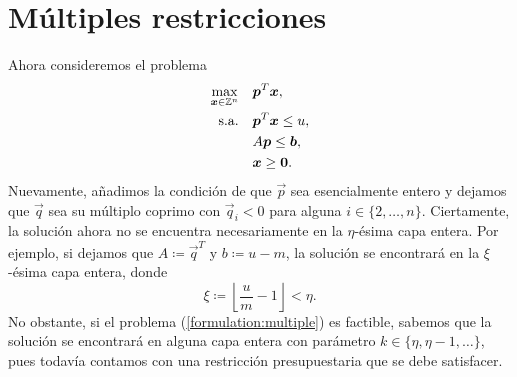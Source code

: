 \section{Múltiples restricciones}
\noindent
Ahora consideremos el problema
\begin{subequations}
	\label{formulation:multiple}
	\begin{align}
		\max_{\boldsymbol{x} \in \mathbb{Z}^n} \quad
			& \boldsymbol{p}^T\boldsymbol{x}, \label{formulation:multiple:objective} \\
		\text{s.a.} \quad
			& \boldsymbol{p}^T\boldsymbol{x} \leq u, \label{formulation:multiple:constraint:budget} \\
			& A\boldsymbol{p} \leq \boldsymbol{b}, \label{formulation:multiple:constraints} \\
			& \boldsymbol{x} \geq \boldsymbol{0}. \nonumber
	\end{align}
\end{subequations}
Nuevamente, añadimos la condición de que $\vec{p}$ sea esencialmente entero y dejamos que $\vec{q}$
sea su múltiplo coprimo con $\vec{q}_i < 0$ para alguna $i \in \lbrace 2, \ldots, n \rbrace$.
Ciertamente, la solución ahora no se encuentra necesariamente en la $\eta$-ésima capa entera. Por
ejemplo, si dejamos que $A \coloneq \vec{q}^T$ y $b \coloneq u - m$, la solución se encontrará en la
$\xi$-ésima capa entera, donde
\begin{equation*}
	\xi \coloneq \left\lfloor \frac{u}{m} - 1 \right\rfloor < \eta.
\end{equation*}
No obstante, si el problema (\ref{formulation:multiple}) es factible, sabemos que la solución se
encontrará en alguna capa entera con parámetro $k \in \lbrace \eta, \eta - 1, \ldots \rbrace$, pues
todavía contamos con una restricción presupuestaria que se debe satisfacer.

